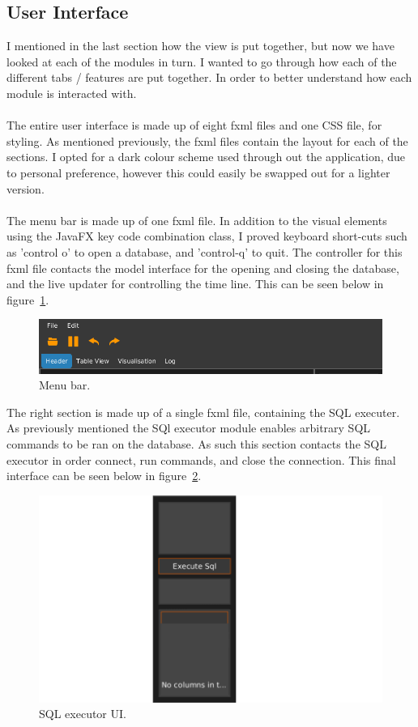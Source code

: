 \subsection{User Interface}
\label{subsec:user_interface_imp}

I mentioned in the last section how the view is put together, but now we have looked at each of the modules in turn. I wanted to go through how each of the different tabs / features are put together. In order to better understand how each module is interacted with.
\\\\
The entire user interface is made up of eight fxml files and one CSS file, for styling. As mentioned previously, the fxml files contain the layout for each of the sections. I opted for a dark colour scheme used through out the application, due to personal preference, however this could easily be swapped out for a lighter version. 
\\\\
The menu bar is made up of one fxml file. In addition to the visual elements using the JavaFX key code combination class, I proved keyboard short-cuts such as 'control o' to open a database, and 'control-q' to quit. The controller for this fxml file  contacts the model interface for the opening and closing the database, and the live updater for controlling the time line.  This can be seen below in figure~\ref{fig:ui_screen}.

\begin{figure}[H]
	\centering
	\includegraphics[scale=0.32]{images/ui_screen.png}
	\caption{Menu bar.}
	\label{fig:ui_screen}
\end{figure}

The right section is made up of a single fxml file, containing the SQL executer. As previously mentioned the SQl executor module enables arbitrary SQL commands to be ran on the database. As such this section contacts the SQL executor in order connect, run commands, and close the connection. This final interface can be seen below in figure~\ref{fig:ui_imp_sqlexe}.

\begin{figure}[H]
	\centering
	\includegraphics[scale=0.7]{images/ui_sqlexe_design_final.png}
	\caption{SQL executor UI.}
	\label{fig:ui_imp_sqlexe}
\end{figure}


